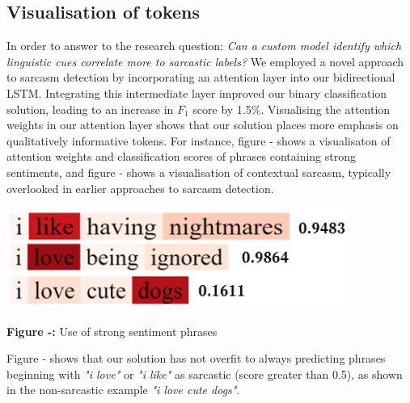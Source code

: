 \documentclass[12pt,a4paper]{article}
\begin{document}
\subsection{Visualisation of tokens}\vspace{-10pt}
\noindent In order to answer to the research question: \textit{Can a custom model identify which linguistic cues correlate more to sarcastic labels?}  We employed a novel approach to sarcasm detection by incorporating an attention layer into our bidirectional LSTM. Integrating this intermediate layer improved our binary classification solution, leading to an increase in $F_1$ score by 1.5\%. Visualising the attention weights in our attention layer shows that our solution places more emphasis on qualitatively informative tokens. For instance, figure - shows a visualisaton of attention weights and classification scores of phrases containing strong sentiments, and figure - shows a visualisation of contextual sarcasm, typically overlooked in earlier approaches to sarcasm detection.\\\vspace{-8pt}


\hspace{-5pt}\begin{minipage}{0.5\textwidth}
	\begin{center}
		\hspace{-1cm}\includegraphics[width=0.84\textwidth]{Images/overt examples2.png}\\
	\end{center}\vspace{-8pt}
	\textbf{Figure -:} Use of strong sentiment phrases
\end{minipage}
\hspace{-20pt}
\begin{minipage}{0.5\textwidth}
Figure - shows that our solution has not overfit to always predicting phrases beginning with \textit{"i love"} or \textit{"i like"} as sarcastic (score greater than 0.5), as shown in the non-sarcastic example \textit{"i love cute dogs"}. 
\end{minipage}\\
\end{document}
